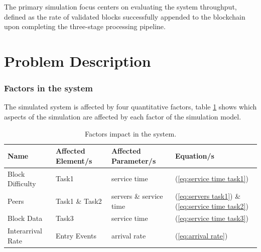 \documentclass[12pt,a4paper]{article}
\begin{document}
	The primary simulation focus centers on evaluating the system throughput, defined as the rate of validated blocks successfully appended to the blockchain upon completing the three-stage processing pipeline.
	
	\section{Problem Description}
	\label{sec:problem_description}
	
	\subsubsection*{Factors in the system}
	The simulated system is affected by four quantitative factors, table \ref{tab:factors} shows which aspects of the simulation are affected by each factor of the simulation model. 
	
	
	\begin{table}[htbp]
		\centering
		\begin{tabular}{llll}
			\toprule
			\textbf{Name} & \textbf{Affected Element/s} & \textbf{Affected Parameter/s} & \textbf{Equation/s}\\
			\midrule
			Block Difficulty & Task1 & service time & (\ref{eq:service time task1})\\
			Peers & Task1 \& Task2 & servers \& service time &  (\ref{eq:servers task1}) \& (\ref{eq:service time task2})\\
			Block Data & Task3 & service time & (\ref{eq:service time task3})\\
			Interarrival Rate & Entry Events & arrival rate & (\ref{eq:arrival rate}) \\
			\bottomrule
		\end{tabular}
		\caption{Factors impact in the system.}
		\label{tab:factors}
	\end{table}
	
\end{document}
